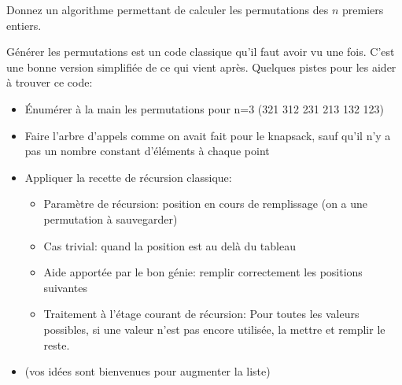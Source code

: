 \documentclass[10pt]{article}\usepackage[correction,nu]{esial}
\begin{document}
\begin{Question}
  Donnez un algorithme permettant de calculer les permutations des $n$ premiers
  entiers.
\end{Question}
\begin{Reponse}
  Générer les permutations est un code classique qu'il faut avoir vu une
  fois. C'est une bonne version simplifiée de ce qui vient après.  Quelques
  pistes pour les aider à trouver ce code:
  \begin{itemize}
  \item Énumérer à la main les permutations pour n=3 (321 312 231 213 132 123)
  \item Faire l'arbre d'appels comme on avait fait pour le knapsack, sauf qu'il
    n'y a pas un nombre constant d'éléments à chaque point
  \item Appliquer la recette de récursion classique:
    \begin{itemize}
    \item Paramètre de récursion: position en cours de remplissage (on a une
      permutation à sauvegarder)
    \item Cas trivial: quand la position est au delà du tableau
    \item Aide apportée par le bon génie: remplir correctement les positions suivantes
    \item Traitement à l'étage courant de récursion: Pour toutes les valeurs
      possibles, si une valeur n'est pas encore utilisée, la mettre et remplir
      le reste.
    \end{itemize}
  \item (vos idées sont bienvenues pour augmenter la liste)
  \end{itemize}
 
  \newcommand*\FancyVerbStopString{// Fin génération, début du test}
\end{Reponse}
\end{document}
